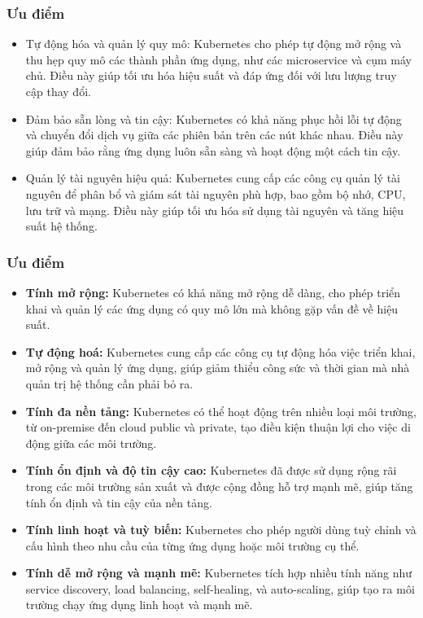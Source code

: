 \subsubsection{Ưu điểm}
\begin{itemize}
    \item Tự động hóa và quản lý quy mô: Kubernetes cho phép tự động mở rộng và thu hẹp quy mô các thành phần ứng dụng, như các microservice và cụm máy chủ. Điều này giúp tối ưu hóa hiệu suất và đáp ứng đối với lưu lượng truy cập thay đổi.

    \item Đảm bảo sẵn lòng và tin cậy: Kubernetes có khả năng phục hồi lỗi tự động và chuyển đổi dịch vụ giữa các phiên bản trên các nút khác nhau. Điều này giúp đảm bảo rằng ứng dụng luôn sẵn sàng và hoạt động một cách tin cậy.

    \item Quản lý tài nguyên hiệu quả: Kubernetes cung cấp các công cụ quản lý tài nguyên để phân bổ và giám sát tài nguyên phù hợp, bao gồm bộ nhớ, CPU, lưu trữ và mạng. Điều này giúp tối ưu hóa sử dụng tài nguyên và tăng hiệu suất hệ thống.

\end{itemize}
\subsubsection{Ưu điểm}
\begin{itemize}
  \item \textbf{Tính mở rộng:} Kubernetes có khả năng mở rộng dễ dàng, cho phép triển khai và quản lý các ứng dụng có quy mô lớn mà không gặp vấn đề về hiệu suất.
  \item \textbf{Tự động hoá:} Kubernetes cung cấp các công cụ tự động hóa việc triển khai, mở rộng và quản lý ứng dụng, giúp giảm thiểu công sức và thời gian mà nhà quản trị hệ thống cần phải bỏ ra.
  \item \textbf{Tính đa nền tảng:} Kubernetes có thể hoạt động trên nhiều loại môi trường, từ on-premise đến cloud public và private, tạo điều kiện thuận lợi cho việc di động giữa các môi trường.
  \item \textbf{Tính ổn định và độ tin cậy cao:} Kubernetes đã được sử dụng rộng rãi trong các môi trường sản xuất và được cộng đồng hỗ trợ mạnh mẽ, giúp tăng tính ổn định và tin cậy của nền tảng.
  \item \textbf{Tính linh hoạt và tuỳ biến:} Kubernetes cho phép người dùng tuỳ chỉnh và cấu hình theo nhu cầu của từng ứng dụng hoặc môi trường cụ thể.
  \item \textbf{Tính dễ mở rộng và mạnh mẽ:} Kubernetes tích hợp nhiều tính năng như service discovery, load balancing, self-healing, và auto-scaling, giúp tạo ra môi trường chạy ứng dụng linh hoạt và mạnh mẽ.
\end{itemize}
